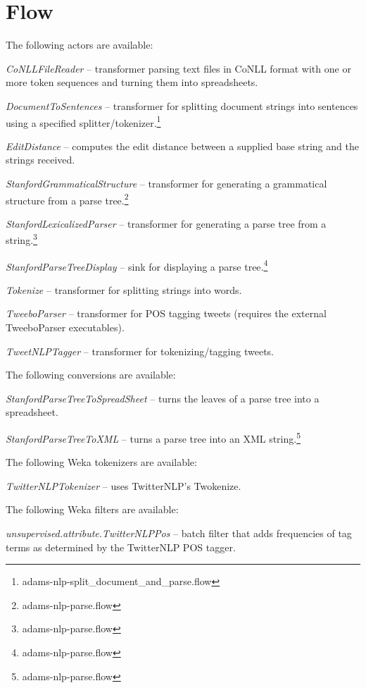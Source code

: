 \documentclass[a4paper]{book}
\begin{document}
\chapter{Flow}
The following actors are available:
\begin{tight_itemize}
	\item \textit{CoNLLFileReader} -- transformer parsing text files in
	CoNLL format with one or more token sequences and turning them into
	spreadsheets.
	\item \textit{DocumentToSentences} -- transformer for splitting document
	strings into sentences using a specified
	splitter/tokenizer.\footnote{adams-nlp-split\_document\_and\_parse.flow}
	\item \textit{EditDistance} -- computes the edit distance between
	a supplied base string and the strings received.
	\item \textit{StanfordGrammaticalStructure} -- transformer for generating a
	grammatical structure from a parse tree.\footnote{adams-nlp-parse.flow}
	\item \textit{StanfordLexicalizedParser} -- transformer for generating a 
	parse tree from a string.\footnote{adams-nlp-parse.flow}
	\item \textit{StanfordParseTreeDisplay} -- sink for displaying a parse 
	tree.\footnote{adams-nlp-parse.flow}
	\item \textit{Tokenize} -- transformer for splitting strings
	into words.
	\item \textit{TweeboParser} -- transformer for POS tagging tweets
	(requires the external TweeboParser executables).
	\item \textit{TweetNLPTagger} -- transformer for tokenizing/tagging
	tweets.
\end{tight_itemize}
The following conversions are available:
\begin{tight_itemize}
   	\item \textit{StanfordParseTreeToSpreadSheet} -- turns the leaves of a
   	parse tree into a spreadsheet.
	\item \textit{StanfordParseTreeToXML} -- turns a parse tree into an
	XML string.\footnote{adams-nlp-parse.flow}
\end{tight_itemize}
The following Weka tokenizers are available:
\begin{tight_itemize}
	\item \textit{TwitterNLPTokenizer} -- uses TwitterNLP's Twokenize.
\end{tight_itemize}
The following Weka filters are available:
\begin{tight_itemize}
	\item \textit{unsupervised.attribute.TwitterNLPPos} -- batch filter
	that adds frequencies of tag terms as determined by the TwitterNLP
	POS tagger.
\end{tight_itemize}


\end{document}
